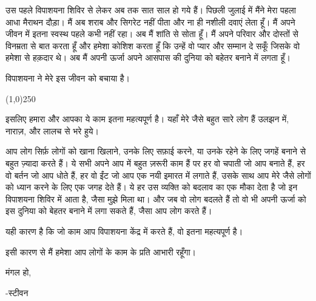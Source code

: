 \documentclass{article}
\begin{document}
उस पहले विपाशयना शिविर से लेकर अब तक सात साल हो गये हैं। पिछली जुलाई में मैंने मेरा पहला आधा मैराथन
दौड़ा। मैं अब शराब और सिगरेट नहीं पीता और ना ही नशीली दवाएं लेता हूँ। मैं अपने जीवन में इतना स्वस्थ पहले
कभी नहीं रहा। अब मैं शांति से सोता हूँ। मैं अपने परिवार और दोस्तों से विनम्रता से बात करता हूँ और हमेशा
कोशिश करता हूँ कि उन्हें वो प्यार और सम्मान दे सकूँ जिसके वो हमेशा से हक़दार थे। अब मैं अपनी ऊर्जा अपने
आसपास की दुनिया को बहेतर बनाने में लगता हूँ।

विपाशयना ने मेरे इस जीवन को बचाया है।

\begin{center}
\line(1,0){250}
\end{center}

इसलिए हमारा और आपका ये काम इतना महत्यपूर्ण है। यहाँ मेरे जैसे बहुत सारे लोग हैं \textemdash उलझन में, नाराज़, और लालच से भरे हुये।

आप लोग सिर्फ़ लोगों को खाना खिलाने, उनके लिए सफ़ाई करने, या उनके रहेने के लिए जगहें बनाने से बहुत
ज़्यादा करते हैं। ये सभी अपने आप में बहुत ज़रूरी काम हैं पर हर वो चपाती जो आप बनाते हैं, हर वो बर्तन जो आप धोते हैं, हर वो ईंट जो आप एक नयी इमारत में लगाते हैं, उसके साथ आप मेरे जैसे लोगों को ध्यान करने के लिए एक जगह देते हैं।
ये हर उस व्यक्ति को बदलाव का एक मौका देता है जो इन विपाशयना शिविर में
आता है, जैसा मुझे मिला था। और जब वो लोग बदलते हैं तो वो भी अपनी ऊर्जा को इस दुनिया को बेहतर
बनाने में लगा सकते हैं, जैसा आप लोग करते हैं।

यही कारण है कि जो काम आप विपाशयना केंद्र में करते हैं, वो इतना महत्यपूर्ण है।

इसी कारण से मैं हमेशा आप लोगों के काम के प्रति आभारी रहूँगा।

मंगल हो,

-स्टीवन
\end{document}
